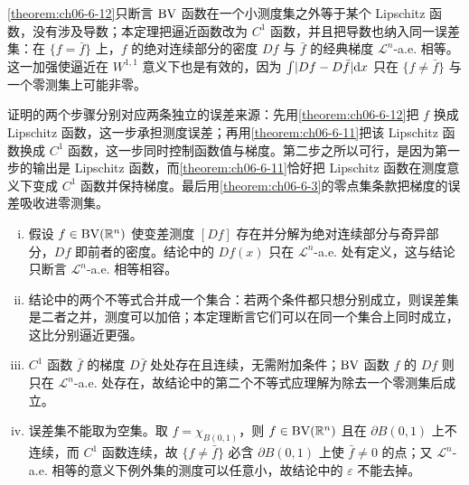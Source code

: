 \documentclass[../../main.tex]{subfiles}%
\begin{document}
\begin{remark}\label{remark:ch06-thm-6-13-动机}
\cref{theorem:ch06-6-12}只断言 $\mathrm{BV}$ 函数在一个小测度集之外等于某个 Lipschitz 函数，没有涉及导数；本定理把逼近函数改为 $C^1$ 函数，并且把导数也纳入同一误差集：在 $\{f=\bar f\}$ 上，$f$ 的绝对连续部分的密度 $Df$ 与 $\bar f$ 的经典梯度 $\mathcal{L}^n$-a.e. 相等。这一加强使逼近在 $W^{1,1}$ 意义下也是有效的，因为 $\int\lvert Df-D\bar f\rvert\mathrm{d} x$ 只在 $\{f\ne\bar f\}$ 与一个零测集上可能非零。%

证明的两个步骤分别对应两条独立的误差来源：先用\cref{theorem:ch06-6-12}把 $f$ 换成 Lipschitz 函数，这一步承担测度误差；再用\cref{theorem:ch06-6-11}把该 Lipschitz 函数换成 $C^1$ 函数，这一步同时控制函数值与梯度。第二步之所以可行，是因为第一步的输出是 Lipschitz 函数，而\cref{theorem:ch06-6-11}恰好把 Lipschitz 函数在测度意义下变成 $C^1$ 函数并保持梯度。最后用\cref{theorem:ch06-6-3}的零点集条款把梯度的误差吸收进零测集。%
\end{remark}

\begin{remark}\label{remark:ch06-thm-6-13-条件}
\begin{enumerate}[(i)]
\item 假设 $f\in\mathrm{BV}(\mathbb{R}^n)$ 使变差测度 $[Df]$ 存在并分解为绝对连续部分与奇异部分，$Df$ 即前者的密度。结论中的 $Df(x)$ 只在 $\mathcal{L}^n$-a.e. 处有定义，这与结论只断言 $\mathcal{L}^n$-a.e. 相等相容。
\item 结论中的两个不等式合并成一个集合：若两个条件都只想分别成立，则误差集是二者之并，测度可以加倍；本定理断言它们可以在同一个集合上同时成立，这比分别逼近更强。
\item $C^1$ 函数 $\bar f$ 的梯度 $D\bar f$ 处处存在且连续，无需附加条件；$\mathrm{BV}$ 函数 $f$ 的 $Df$ 则只在 $\mathcal{L}^n$-a.e. 处存在，故结论中的第二个不等式应理解为除去一个零测集后成立。
\item 误差集不能取为空集。取 $f=\chi_{B(0,1)}$，则 $f\in\mathrm{BV}(\mathbb{R}^n)$ 且在 $\partial B(0,1)$ 上不连续，而 $C^1$ 函数连续，故 $\{f\ne\bar f\}$ 必含 $\partial B(0,1)$ 上使 $\bar f\ne0$ 的点；又 $\mathcal{L}^n$-a.e. 相等的意义下例外集的测度可以任意小，故结论中的 $\varepsilon$ 不能去掉。
\end{enumerate}
\end{remark}
\end{document}
